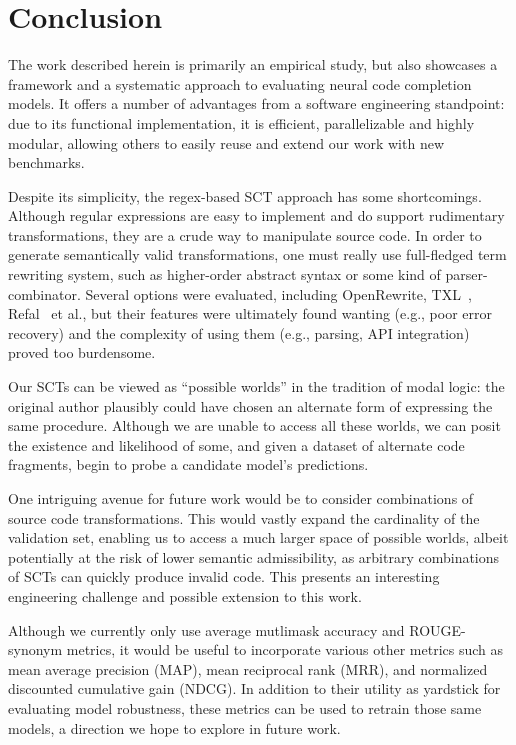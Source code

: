 \documentclass[usenames,dvipsnames]{article} %
\begin{document}
  \section{Conclusion}\label{sec:conclusion}

  The work described herein is primarily an empirical study, but also showcases a framework and a systematic approach to evaluating neural code completion models. It offers a number of advantages from a software engineering standpoint: due to its functional implementation, it is efficient, parallelizable and highly modular, allowing others to easily reuse and extend our work with new benchmarks.

  Despite its simplicity, the regex-based SCT approach has some shortcomings. Although regular expressions are easy to implement and do support rudimentary transformations, they are a crude way to manipulate source code. In order to generate semantically valid transformations, one must really use full-fledged term rewriting system, such as higher-order abstract syntax or some kind of parser-combinator. Several options were evaluated, including OpenRewrite, TXL~\citep{cordy2004txl}, Refal~\citep{gurin1991refal} et al., but their features were ultimately found wanting (e.g., poor error recovery) and the complexity of using them (e.g., parsing, API integration) proved too burdensome.

  Our SCTs can be viewed as ``possible worlds'' in the tradition of modal logic: the original author plausibly could have chosen an alternate form of expressing the same procedure. Although we are unable to access all these worlds, we can posit the existence and likelihood of some, and given a dataset of alternate code fragments, begin to probe a candidate model's predictions.

  One intriguing avenue for future work would be to consider combinations of source code transformations. This would vastly expand the cardinality of the validation set, enabling us to access a much larger space of possible worlds, albeit potentially at the risk of lower semantic admissibility, as arbitrary combinations of SCTs can quickly produce invalid code. This presents an interesting engineering challenge and possible extension to this work.

  Although we currently only use average mutlimask accuracy and ROUGE-synonym metrics, it would be useful to incorporate various other metrics such as mean average precision (MAP), mean reciprocal rank (MRR), and normalized discounted cumulative gain (NDCG). In addition to their utility as yardstick for evaluating model robustness, these metrics can be used to retrain those same models, a direction we hope to explore in future work.
\end{document}
